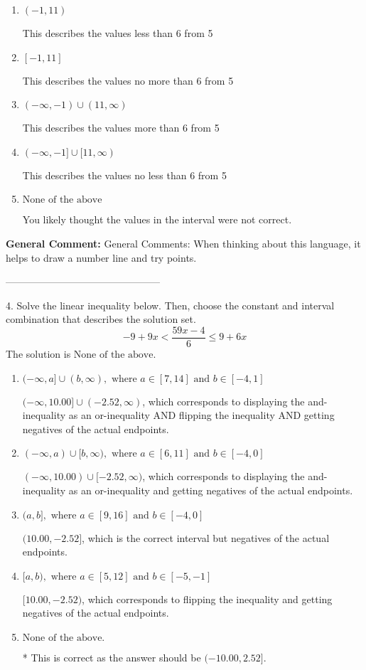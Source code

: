 \documentclass{extbook}[14pt]
\begin{document}
\begin{enumerate}[label=\Alph*.] 
\item $ (-1, 11) $ 

 This describes the values less than 6 from 5 
\item $ [-1, 11] $ 

 This describes the values no more than 6 from 5 
\item $ (-\infty, -1) \cup (11, \infty) $ 

 This describes the values more than 6 from 5 
\item $ (-\infty, -1] \cup [11, \infty) $ 

 This describes the values no less than 6 from 5 
\item $ \text{None of the above} $ 

 You likely thought the values in the interval were not correct. 
\end{enumerate} 
 
\textbf{General Comment:} General Comments: When thinking about this language, it helps to draw a number line and try points. 

-----------------------------------------------

4. Solve the linear inequality below. Then, choose the constant and interval combination that describes the solution set.
\[ -9 + 9 x < \frac{59 x - 4}{6} \leq 9 + 6 x \] 
The solution is $ \text{None of the above.} $ 

\begin{enumerate}[label=\Alph*.] 
\item $ (-\infty, a] \cup (b, \infty), \text{ where } a \in [7, 14] \text{ and } b \in [-4, 1] $ 

 $(-\infty, 10.00] \cup (-2.52, \infty)$, which corresponds to displaying the and-inequality as an or-inequality AND flipping the inequality AND getting negatives of the actual endpoints. 
\item $ (-\infty, a) \cup [b, \infty), \text{ where } a \in [6, 11] \text{ and } b \in [-4, 0] $ 

 $(-\infty, 10.00) \cup [-2.52, \infty)$, which corresponds to displaying the and-inequality as an or-inequality and getting negatives of the actual endpoints. 
\item $ (a, b], \text{ where } a \in [9, 16] \text{ and } b \in [-4, 0] $ 

 $(10.00, -2.52]$, which is the correct interval but negatives of the actual endpoints. 
\item $ [a, b), \text{ where } a \in [5, 12] \text{ and } b \in [-5, -1] $ 

 $[10.00, -2.52)$, which corresponds to flipping the inequality and getting negatives of the actual endpoints. 
\item $ \text{None of the above.} $ 

 * This is correct as the answer should be $(-10.00, 2.52]$. 
\end{enumerate} 
 
\end{document}
